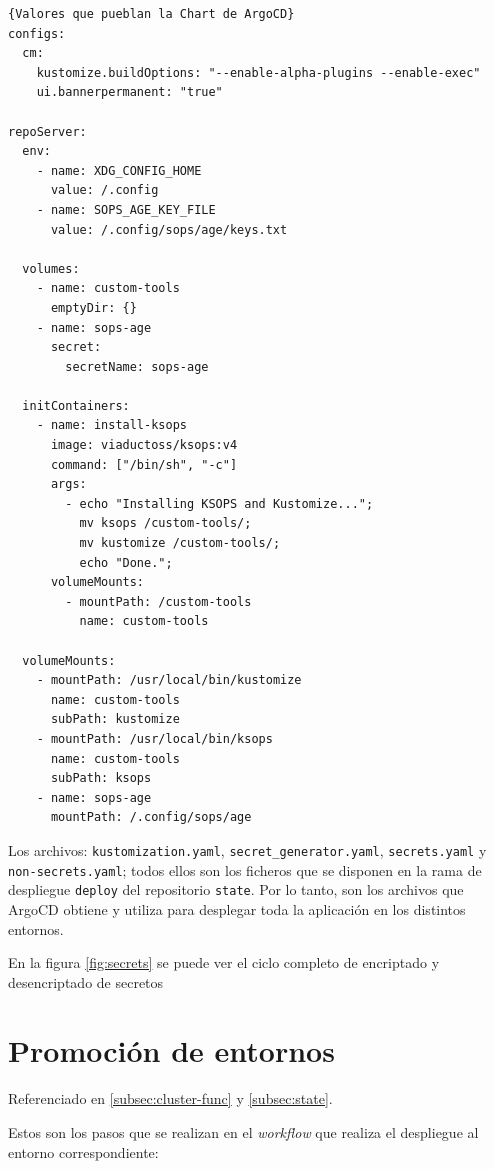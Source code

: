 \begin{lstlisting}[language=helm,label=lst:argo-values]{Valores que pueblan la Chart de ArgoCD}
configs:
  cm:
    kustomize.buildOptions: "--enable-alpha-plugins --enable-exec"
    ui.bannerpermanent: "true"

repoServer:
  env:
    - name: XDG_CONFIG_HOME
      value: /.config
    - name: SOPS_AGE_KEY_FILE
      value: /.config/sops/age/keys.txt

  volumes:
    - name: custom-tools
      emptyDir: {}
    - name: sops-age
      secret:
        secretName: sops-age

  initContainers:
    - name: install-ksops
      image: viaductoss/ksops:v4
      command: ["/bin/sh", "-c"]
      args:
        - echo "Installing KSOPS and Kustomize...";
          mv ksops /custom-tools/;
          mv kustomize /custom-tools/;
          echo "Done.";
      volumeMounts:
        - mountPath: /custom-tools
          name: custom-tools

  volumeMounts:
    - mountPath: /usr/local/bin/kustomize
      name: custom-tools
      subPath: kustomize
    - mountPath: /usr/local/bin/ksops
      name: custom-tools
      subPath: ksops
    - name: sops-age
      mountPath: /.config/sops/age
\end{lstlisting}

Los archivos: \texttt{kustomization.yaml}, \texttt{secret\_generator.yaml}, \texttt{secrets.yaml} y \texttt{non-secrets.yaml}; todos ellos son los ficheros que se disponen en la rama de despliegue \texttt{deploy} del repositorio \texttt{state}. Por lo tanto, son los archivos que ArgoCD obtiene y utiliza para desplegar toda la aplicación en los distintos entornos.

En la figura \ref{fig:secrets} se puede ver el ciclo completo de encriptado y desencriptado de secretos

\section{Promoción de entornos}
\label{sec:promotion}

Referenciado en \ref{subsec:cluster-func} y \ref{subsec:state}.

Estos son los pasos que se realizan en el \textit{workflow} que realiza el despliegue al entorno correspondiente:

